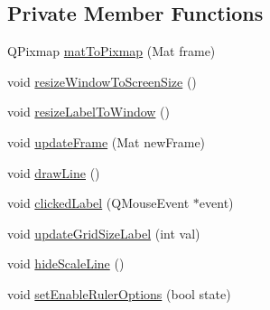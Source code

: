 \subsection*{Private Member Functions}
\begin{DoxyCompactItemize}
\item 
Q\+Pixmap \mbox{\hyperlink{class_measuring_interface_ae5ad3ff4b380dd0465378dabc4265218}{mat\+To\+Pixmap}} (Mat frame)
\item 
void \mbox{\hyperlink{class_measuring_interface_aad66adca9dfebeb4bec1a83c1fd7c043}{resize\+Window\+To\+Screen\+Size}} ()
\item 
void \mbox{\hyperlink{class_measuring_interface_a167a8fe58e371ea039490e90aa07c87d}{resize\+Label\+To\+Window}} ()
\item 
void \mbox{\hyperlink{class_measuring_interface_ac117ad50a7b325e4aff2651a6a04d1f4}{update\+Frame}} (Mat new\+Frame)
\item 
void \mbox{\hyperlink{class_measuring_interface_a0a8a206b6c86b0903943ae0646d09ff8}{draw\+Line}} ()
\item 
void \mbox{\hyperlink{class_measuring_interface_a62ef5d03298c79e95511272a0c113ab8}{clicked\+Label}} (Q\+Mouse\+Event $\ast$event)
\item 
void \mbox{\hyperlink{class_measuring_interface_a049b5fba322e426db13761cf8d66f8a2}{update\+Grid\+Size\+Label}} (int val)
\item 
void \mbox{\hyperlink{class_measuring_interface_ad6344a968dacd55de9a7509698442d67}{hide\+Scale\+Line}} ()
\item 
void \mbox{\hyperlink{class_measuring_interface_acf541a942e47266c30a8d473de4aca98}{set\+Enable\+Ruler\+Options}} (bool state)
\end{DoxyCompactItemize}
